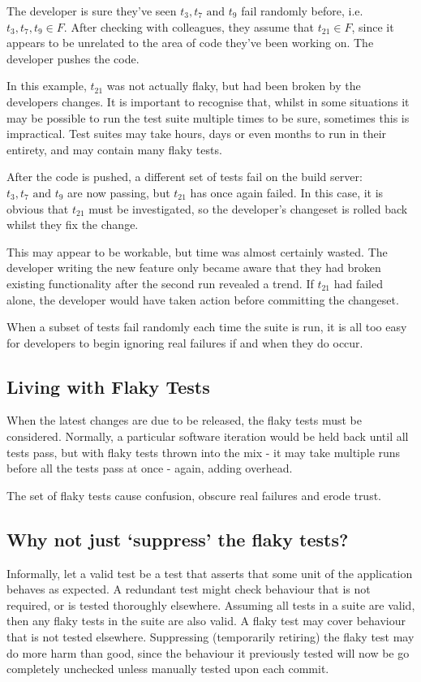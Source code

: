 The developer is sure they’ve seen $t_{3}, t_{7} \text{ and } t_{9}$ fail randomly before, i.e. $t_{3}, t_{7}, t_{9} \in F$. After checking with colleagues, they assume that $t_{21} \in F$, since it appears to be unrelated to the area of code they’ve been working on. The developer pushes the code.

In this example, $t_{21}$ was not actually flaky, but had been broken by the developers changes. It is important to recognise that, whilst in some situations it may be possible to run the test suite multiple times to be sure, sometimes this is impractical. Test suites may take hours, days or even months to run in their entirety, and may contain many flaky tests.

After the code is pushed, a different set of tests fail on the build server: $t_{3}, t_{7} \text{ and } t_{9}$ are now passing, but $t_{21}$ has once again failed. In this case, it is obvious that $t_{21}$ must be investigated, so the developer’s changeset is rolled back whilst they fix the change.

This may appear to be workable, but time was almost certainly wasted. The developer writing the new feature only became aware that they had broken existing functionality after the second run revealed a trend. If $t_{21}$ had failed alone, the developer would have taken action before committing the changeset.

When a subset of tests fail randomly each time the suite is run, it is all too easy for developers to begin ignoring real failures if and when they do occur.

\subsection{Living with Flaky Tests}

When the latest changes are due to be released, the flaky tests must be considered. Normally, a particular software iteration would be held back until all tests pass, but with flaky tests thrown into the mix - it may take multiple runs before all the tests pass at once - again, adding overhead.

The set of flaky tests cause confusion, obscure real failures and erode trust.

\subsection{Why not just ‘suppress’ the flaky tests?}

Informally, let a valid test be a test that asserts that some unit of the application behaves as expected. A redundant test might check behaviour that is not required, or is tested thoroughly elsewhere. Assuming all tests in a suite are valid, then any flaky tests in the suite are also valid. A flaky test may cover behaviour that is not tested elsewhere. Suppressing (temporarily retiring) the flaky test may do more harm than good, since the behaviour it previously tested will now be go completely unchecked unless manually tested upon each commit.

